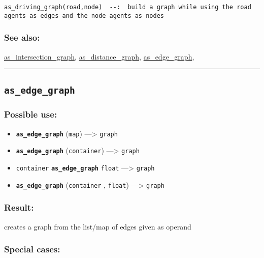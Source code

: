 \documentclass[]{book}
\providecommand{\tightlist}{%
  \setlength{\itemsep}{0pt}\setlength{\parskip}{0pt}}
\theoremstyle{definition}
\theoremstyle{definition}
\theoremstyle{definition}
\theoremstyle{remark}
\begin{document}
\begin{verbatim}
as_driving_graph(road,node)  --:  build a graph while using the road agents as edges and the node agents as nodes 
\end{verbatim}

\subsubsection{See also:}\label{see-also-31}

\href{OperatorsAA\#as_intersection_graph}{as\_intersection\_graph},
\href{OperatorsAA\#as_distance_graph}{as\_distance\_graph},
\href{OperatorsAA\#as_edge_graph}{as\_edge\_graph},

\begin{center}\rule{0.5\linewidth}{\linethickness}\end{center}

\subsection{\texorpdfstring{\texttt{as\_edge\_graph}}{as\_edge\_graph}}\label{as_edge_graph}

\subsubsection{Possible use:}\label{possible-use-47}

\begin{itemize}
\tightlist
\item
  \textbf{\texttt{as\_edge\_graph}} (\texttt{map}) ---\textgreater{}
  \texttt{graph}
\item
  \textbf{\texttt{as\_edge\_graph}} (\texttt{container})
  ---\textgreater{} \texttt{graph}
\item
  \texttt{container} \textbf{\texttt{as\_edge\_graph}} \texttt{float}
  ---\textgreater{} \texttt{graph}
\item
  \textbf{\texttt{as\_edge\_graph}} (\texttt{container} ,
  \texttt{float}) ---\textgreater{} \texttt{graph}
\end{itemize}

\subsubsection{Result:}\label{result-46}

creates a graph from the list/map of edges given as operand

\subsubsection{Special cases:}\label{special-cases-18}
\end{document}
